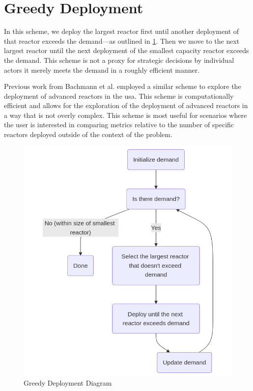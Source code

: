 \section{Greedy Deployment}
\label{sec:greedy_deployment}

In this scheme, we deploy the largest reactor first until another
deployment of that reactor exceeds the demand---as outlined in
\ref{fig:greedy_diagram}. Then we move to the next largest reactor until the
next deployment of the smallest capacity reactor exceeds the
demand. This scheme is not a proxy for strategic decisions by individual
actors it merely meets the demand in a roughly efficient manner.

Previous work from Bachmann et al. \cite{bachmann_enrichment_2021}
employed a similar scheme to explore the deployment of advanced
reactors in the \gls{usa}. This scheme is computationally efficient and allows
for the exploration of the deployment of advanced reactors in a way that is not
overly complex. This scheme is most useful for scenarios where the user is
interested in comparing metrics relative to the number of specific reactors
deployed outside of the context of the problem.

\begin{figure}[H]
    \centering
    \includegraphics[scale=0.4]{images/schemes/greedy_diagram.png}
    \caption{Greedy Deployment Diagram}
    \label{fig:greedy_diagram}
\end{figure}

